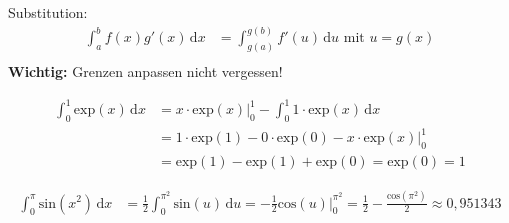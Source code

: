 Substitution:
\begin{align*}
	\int_a^b \! f(x)g'(x) \, \mathrm{d}x &= \int_{g(a)}^{g(b)} \! f'(u) \, \mathrm{d}u\text{ mit }u = g(x) \\
\end{align*}
\textbf{Wichtig:} Grenzen anpassen nicht vergessen!

\begin{align*}
	\int_0^1 \! \text{exp}(x) \, \mathrm{d}x &= x\cdot \text{exp}(x)\bigg\vert_0^1 - \int_0^1 \! 1\cdot\text{exp}(x) \, \mathrm{d}x \\
	&= 1\cdot\text{exp}(1)-0\cdot\text{exp}(0) - x\cdot\text{exp}(x)\bigg\vert_0^1 \\
	&= \text{exp}(1) - \text{exp}(1) + \text{exp}(0) = \text{exp}(0) = 1
\end{align*}

\bigskip
\begin{align*}
	\int_0^\pi \! \text{sin}(x^2) \, \mathrm{d}x &= \frac{1}{2}\int_0^{\pi^2} \! \text{sin}(u) \, \mathrm{d}u = -\frac{1}{2}\text{cos}(u)\bigg\vert_0^{\pi^2} = \frac{1}{2}-\frac{\text{cos}(\pi^2)}{2} \approx 0,951343
\end{align*}



